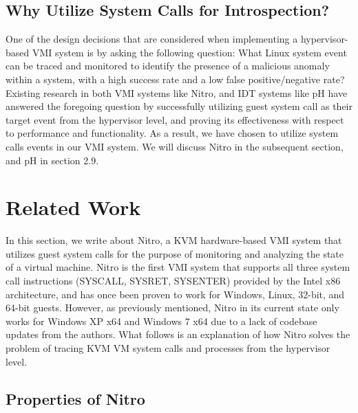 \documentclass{report}
\begin{document}
\begin{spacing}{1.5}
\subsection{Why Utilize System Calls for Introspection?}

{\large
One of the design decisions that are considered when implementing a hypervisor-based VMI system is by asking the following question: What Linux system event can be traced and monitored to identify the presence of a malicious anomaly within a system, with a high success rate and a low false positive/negative rate? Existing research in both VMI systems like Nitro, and IDT systems like pH have answered the foregoing question by successfully utilizing guest system call as their target event from the hypervisor level, and proving its effectiveness with respect to performance and functionality. As a result, we have chosen to utilize system calls events in our VMI system. We will discuss Nitro in the subsequent section, and pH in section 2.9.
\newline
}
















\section{Related Work}

{\large
In this section, we write about Nitro, a KVM hardware-based VMI system that utilizes guest system calls for the purpose of monitoring and analyzing the state of a virtual machine. Nitro is the first VMI system that supports all three system call instructions (SYSCALL, SYSRET, SYSENTER) provided by the Intel x86 architecture, and has once been proven to work for Windows, Linux, 32-bit, and 64-bit guests. However, as previously mentioned, Nitro in its current state only works for Windows XP x64 and Windows 7 x64 due to a lack of codebase updates from the authors. What follows is an explanation of how Nitro solves the problem of tracing KVM VM system calls and processes from the hypervisor level.
\newline
}

\subsection{Properties of Nitro}





\end{spacing}
\end{document}
